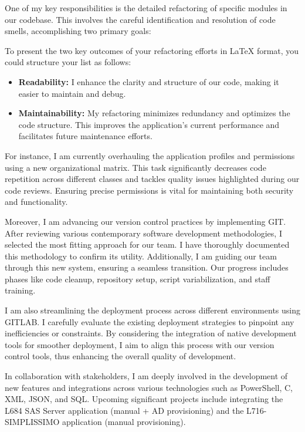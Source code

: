 One of my key responsibilities is the detailed refactoring of specific modules in our codebase. This involves the careful identification and resolution of code smells, accomplishing two primary goals:

To present the two key outcomes of your refactoring efforts in LaTeX format, you could structure your list as follows:

\begin{itemize}
  \item \textbf{Readability:} I enhance the clarity and structure of our code, making it easier to maintain and debug.
  \item \textbf{Maintainability:} My refactoring minimizes redundancy and optimizes the code structure. This improves the application's current performance and facilitates future maintenance efforts.
\end{itemize}

For instance, I am currently overhauling the application profiles and permissions using a new organizational matrix. This task significantly decreases code repetition across different classes and tackles quality issues highlighted during our code reviews. Ensuring precise permissions is vital for maintaining both security and functionality.

Moreover, I am advancing our version control practices by implementing GIT. After reviewing various contemporary software development methodologies, I selected the most fitting approach for our team. I have thoroughly documented this methodology to confirm its utility. Additionally, I am guiding our team through this new system, ensuring a seamless transition. Our progress includes phases like code cleanup, repository setup, script variabilization, and staff training.

I am also streamlining the deployment process across different environments using GITLAB. I carefully evaluate the existing deployment strategies to pinpoint any inefficiencies or constraints. By considering the integration of native development tools for smoother deployment, I aim to align this process with our version control tools, thus enhancing the overall quality of development.

In collaboration with stakeholders, I am deeply involved in the development of new features and integrations across various technologies such as PowerShell, C, XML, JSON, and SQL. Upcoming significant projects include integrating the L684 SAS Server application (manual + AD provisioning) and the L716-SIMPLISSIMO application (manual provisioning).


